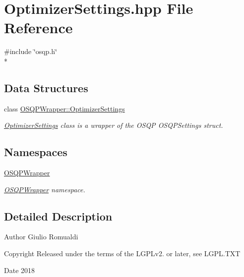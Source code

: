 \section{Optimizer\+Settings.\+hpp File Reference}
\label{OptimizerSettings_8hpp}
{\ttfamily \#include \char`\"{}osqp.\+h\char`\"{}}\\*
\subsection*{Data Structures}
\begin{DoxyCompactItemize}
\item 
class \hyperlink{classOSQPWrapper_1_1OptimizerSettings}{O\+S\+Q\+P\+Wrapper\+::\+Optimizer\+Settings}
\begin{DoxyCompactList}\small\item\em \hyperlink{classOSQPWrapper_1_1OptimizerSettings}{Optimizer\+Settings} class is a wrapper of the O\+S\+QP O\+S\+Q\+P\+Settings struct. \end{DoxyCompactList}\end{DoxyCompactItemize}
\subsection*{Namespaces}
\begin{DoxyCompactItemize}
\item 
 \hyperlink{namespaceOSQPWrapper}{O\+S\+Q\+P\+Wrapper}
\begin{DoxyCompactList}\small\item\em \hyperlink{namespaceOSQPWrapper}{O\+S\+Q\+P\+Wrapper} namespace. \end{DoxyCompactList}\end{DoxyCompactItemize}


\subsection{Detailed Description}
\begin{DoxyAuthor}{Author}
Giulio Romualdi 
\end{DoxyAuthor}
\begin{DoxyCopyright}{Copyright}
Released under the terms of the L\+G\+P\+Lv2. or later, see L\+G\+P\+L.\+T\+XT 
\end{DoxyCopyright}
\begin{DoxyDate}{Date}
2018 
\end{DoxyDate}
